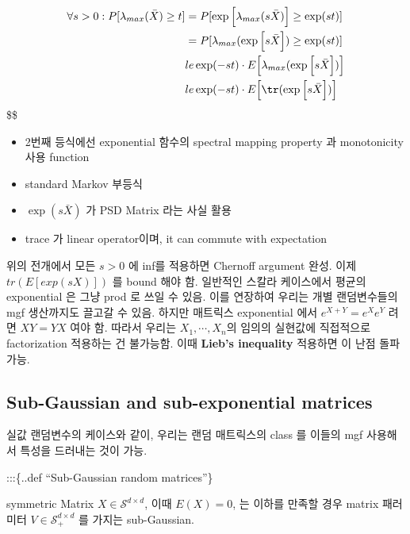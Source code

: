 \documentclass[
]{book}
\providecommand{\tightlist}{%
  \setlength{\itemsep}{0pt}\setlength{\parskip}{0pt}}
\begin{document}
{{{\begin{align}
\forall s >0 :

P[\lambda_{max}(\bar X) \ge t]


&=
P[\exp \Big[ \lambda_{max}(s \bar X) \Big] \ge \exp(st)]
\\

&=
P[ \lambda_{max}(\exp \Big[s \bar X \Big]) \ge \exp(st)]
\\



&le
\exp(-st) \cdot E \Big [ \lambda_{max}(\exp \Big[s \bar X \Big]) \Big ]
\\


&le
\exp(-st) \cdot E \Big [ \tr (\exp \Big[s \bar X \Big]) \Big ]


\end{align}
\$\$

\begin{itemize}
\tightlist
\item
  2번째 등식에선 exponential 함수의 spectral mapping property 과 monotonicity 사용
  function
\item
  standard Markov 부등식
\item
  \(\exp(s \bar X)\) 가 PSD Matrix 라는 사실 활용
\item
  trace 가 linear operator이며, it can commute with expectation
\end{itemize}

위의 전개에서 모든 \(s>0\) 에 inf를 적용하면 Chernoff argument 완성. 이제 \(tr(E[exp(sX)])\) 를 bound 해야 함. 일반적인 스칼라 케이스에서 평균의 exponential 은 그냥 prod 로 쓰일 수 있음. 이를 연장하여 우리는 개별 랜덤변수들의 mgf 생산까지도 끌고갈 수 있음. 하지만 매트릭스 exponential 에서 \(e^{X+Y} = e^X e^Y\) 려면 \(XY=YX\) 여야 함. 따라서 우리는 \(X_1 , \cdots, X_n\)의 임의의 실현값에 직접적으로 factorization 적용하는 건 불가능함. 이때 \textbf{Lieb's inequality} 적용하면 이 난점 돌파 가능.

\hypertarget{sub-gaussian-and-sub-exponential-matrices}{%
\subsection{Sub-Gaussian and sub-exponential matrices}\label{sub-gaussian-and-sub-exponential-matrices}}

실값 랜덤변수의 케이스와 같이, 우리는 랜덤 매트릭스의 class 를 이들의 mgf 사용해서 특성을 드러내는 것이 가능.

:::\{..def ``Sub-Gaussian random matrices''\}

symmetric Matrix \(X \in \mathcal S^{d \times d}\), 이때 \(E(X) = 0\), 는 이하를 만족할 경우 matrix 패러미터 \(V \in \mathcal S^{d \times d}_+\) 를 가지는 sub-Gaussian.

}}}
\end{document}
